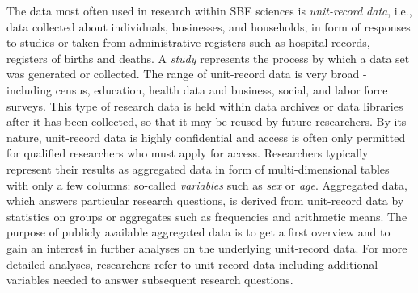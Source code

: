 \documentclass{llncs}
\begin{document}
The data most often used in research within SBE sciences is \emph{unit-record data}, i.e., data collected about individuals, businesses, and households, in form of responses to studies or taken from administrative registers such as hospital records, registers of births and deaths. A \emph{study} represents the process by which a data set was generated or collected. The range of unit-record data is very broad - including census, education, health data and business, social, and labor force surveys. This type of research data is held within data archives or data libraries after it has been collected, so that it may be reused by future researchers. By its nature, unit-record data is highly confidential and access is often only permitted for qualified researchers who must apply for access. Researchers typically represent their results as aggregated data in form of multi-dimensional tables with only a few columns: so-called \emph{variables} such as \emph{sex} or \emph{age}. Aggregated data, which answers particular research questions, is derived from unit-record data by statistics on groups or aggregates such as frequencies and arithmetic means. The purpose of publicly available aggregated data is to get a first overview and to gain an interest in further analyses on the underlying unit-record data. For more detailed analyses, researchers refer to unit-record data including additional variables needed to answer subsequent research questions. 
\end{document}
